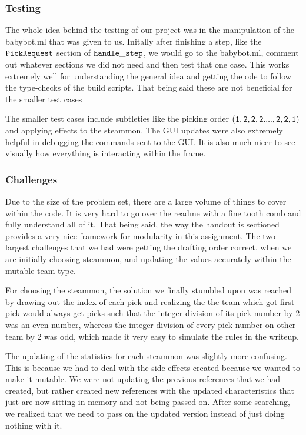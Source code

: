 \documentclass[10pt]{article}
\begin{document}
\subsubsection*{Testing}
The whole idea behind the testing of our project was in the manipulation of the babybot.ml that was given to us. Initally after finishing a step, like the $\tt{PickRequest}$ section of $\tt{handle\_step}$, we would go to the babybot.ml, comment out whatever sections we did not need and then test that one case. This works extremely well for understanding the general idea and getting the ode to follow the type-checks of the build scripts. That being said these are not beneficial for the smaller test cases

The smaller test cases include subtleties like the picking order $\tt{(1,2,2,2....,2,2,1)}$ and applying effects to the steammon. The GUI updates were also extremely helpful in debugging the commands sent to the GUI. It is also much nicer to see visually how everything is interacting within the frame.


\subsubsection*{Challenges}
Due to the size of the problem set, there are a large volume of things to cover within the code. It is very hard to go over the readme with a fine tooth comb and fully understand all of it. That being said, the way the handout is sectioned provides a very nice framework for modularity in this assignment. 
The two largest challenges that we had were getting the drafting order correct, when we are initially choosing steammon, and updating the values accurately within the mutable team type. 

For choosing the steammon, the solution we finally stumbled upon was reached by drawing out the index of each pick and realizing the the team which got first pick would always get picks such that the integer division of its pick number by 2 was an even number, whereas the integer division of every pick number on other team by 2 was odd, which made it very easy to simulate the rules in the writeup.

The updating of the statistics for each steammon was slightly more confusing. This is because we had to deal with the side effects created because we wanted to make it mutable. We were not updating the previous references that we had created, but rather created new references with the updated characteristics that just are now sitting in memory and not being passed on. After some searching, we realized that we need to pass on the updated version instead of just doing nothing with it.
\end{document}
